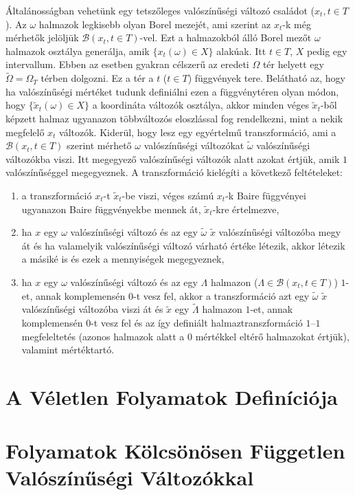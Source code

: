 \documentclass{article}
\begin{document}
Általánosságban vehetünk egy tetszőleges valószínűségi változó családot ($x_t, t \in T$). Az $\omega$ halmazok legkisebb olyan Borel mezejét, ami szerint az $x_t$-k még mérhetők jelöljük $\mathscr{B}(x_t, t \in T)$-vel. Ezt a halmazokból álló Borel mezőt $\omega$ halmazok osztálya generálja, amik $\{x_t(\omega) \in X\}$ alakúak. Itt $t \in T$, $X$ pedig egy intervallum. Ebben az esetben gyakran célszerű az eredeti $\Omega$ tér helyett egy $\tilde{\Omega} = \Omega_T$ térben dolgozni. Ez a tér a $t$ ($t \in T$) függvények tere. Belátható az, hogy ha valószínűségi mértéket tudunk definiálni ezen a függvénytéren olyan módon, hogy $\{\tilde{x}_t(\omega) \in X\}$ a koordináta változók osztálya, akkor minden véges $\tilde{x}_t$-ből képzett halmaz ugyanazon többváltozós eloszlással fog rendelkezni, mint a nekik megfelelő $x_t$ változók. Kiderül, hogy lesz egy egyértelmű transzformáció, ami a $\mathscr{B}(x_t, t \in T)$ szerint mérhető $\omega$ valószínűségi változókat $\tilde{\omega}$ valószínűségi változókba viszi. Itt megegyező valószínűségi változók alatt azokat értjük, amik $1$ valószínűséggel megegyeznek. A transzformáció kielégíti a következő feltételeket:
\begin{enumerate}[label=(\roman*)]
	\item a transzformáció $x_t$-t $\tilde{x}_t$-be viszi, véges számú $x_t$-k Baire függvényei ugyanazon Baire függvényekbe mennek át, $\tilde{x}_t$-kre értelmezve,
	\item ha $x$ egy $\omega$ valószínűségi változó és az egy $\tilde{\omega}$ $\tilde{x}$ valószínűségi változóba megy át és ha valamelyik valószínűségi változó várható értéke létezik, akkor létezik a másiké is és ezek a mennyiségek megegyeznek,
	\item ha $x$ egy $\omega$ valószínűségi változó és az egy $\Lambda$ halmazon ($\Lambda \in \mathscr{B}(x_t, t \in T)$) $1$-et, annak komplemensén $0$-t vesz fel, akkor a transzformáció azt egy $\tilde{\omega}$ $\tilde{x}$ valószínűségi változóba viszi át és $\tilde{x}$ egy $\tilde{\Lambda}$ halmazon $1$-et, annak komplemensén $0$-t vesz fel és az így definiált halmaztranszformáció $1$--$1$ megfeleltetés (azonos halmazok alatt a $0$ mértékkel eltérő halmazokat értjük), valamint mértéktartó. 
\end{enumerate}
\section{A Véletlen Folyamatok Definíciója}\label{sec:veletlenfolyamatokdefinicioja}
\section{Folyamatok Kölcsönösen Független Valószínűségi Változókkal}\label{sec:folyamatokkolcsonosenfuggetlenvaloszinusegivaltozokkal}
\end{document}
